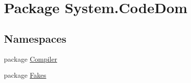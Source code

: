 \hypertarget{namespace_system_1_1_code_dom}{\section{Package System.\-Code\-Dom}
\label{namespace_system_1_1_code_dom}
}
\subsection*{Namespaces}
\begin{DoxyCompactItemize}
\item 
package \hyperlink{namespace_system_1_1_code_dom_1_1_compiler}{Compiler}
\item 
package \hyperlink{namespace_system_1_1_code_dom_1_1_fakes}{Fakes}
\end{DoxyCompactItemize}
